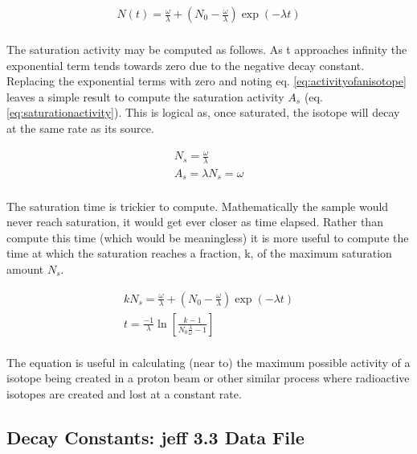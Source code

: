 \begin{equation}
\begin{split}
N(t) = \frac{\omega}{\lambda} + \left(N_{0} - \frac{\omega}{\lambda} \right) \exp(-\lambda t) \\
\end{split}
\label{eq:decayequationoneisotope}
\end{equation}

The saturation activity may be computed as follows.  As t approaches infinity the exponential term tends towards zero due to the negative decay constant.  Replacing the exponential terms with zero and noting eq. \ref{eq:activityofanisotope} leaves a simple result to compute the saturation activity $A_{s}$ (eq. \ref{eq:saturationactivity}).  This is logical as, once saturated, the isotope will decay at the same rate as its source.

\begin{equation}
\begin{split}
N_{s} = \frac{\omega}{\lambda} \\
A_{s} = \lambda N_{s} = \omega \\
\end{split}
\label{eq:saturationactivity}
\end{equation}

The saturation time is trickier to compute.  Mathematically the sample would never reach saturation, it would get ever closer as time elapsed.  Rather than compute this time (which would be meaningless) it is more useful to compute the time at which the saturation reaches a fraction, k, of the maximum saturation amount $N_{s}$.

\begin{equation}
\begin{split}
k N_{s} = \frac{\omega}{\lambda} + \left(N_{0} - \frac{\omega}{\lambda} \right) \exp(-\lambda t) \\
t = \frac{-1}{\lambda} \ln \left[ \frac{k-1}{N_0 \frac{\lambda}{\omega} - 1} \right] \\
\end{split}
\label{eq:saturationactivity}
\end{equation}

The equation is useful in calculating (near to) the maximum possible activity of a isotope being created in a proton beam or other similar process where radioactive isotopes are created and lost at a constant rate.


\subsection{Decay Constants: \acrfull{jeff} 3.3 Data File}

